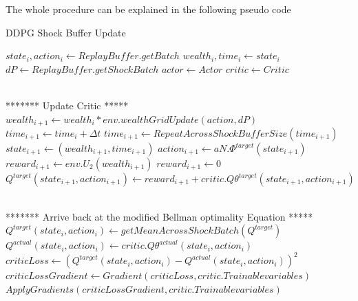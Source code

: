 The whole procedure can be explained in the following pseudo code

\begin{breakablealgorithm}
    

\caption{DDPG Shock Buffer Update}\label{alg:ddpg_shock_buffer_update}
\begin{algorithmic}[1]
\State $state_i,action_i \gets ReplayBuffer.getBatch$
\State $wealth_i,time_i  \gets state_i$
\State $dP \gets ReplayBuffer.getShockBatch$
\State $actor \gets Actor$
\State $critic \gets Critic$

\State \\******* Update Critic  *****\\

\State $wealth_{i+1} \gets wealth_i * env.wealthGridUpdate(action,dP)$  \label{alg:wul}
\State $time_{i+1} \gets time_i + \Delta t$
\State $time_{i+1} \gets RepeatAcrossShockBufferSize(time_{i+1})$ 
\State $state_{i+1} \gets (wealth_{i+1},time_{i+1})$ 
\State $action_{i+1} \gets aN.\Phi^{target}(state_{i+1})$ \label{alg:nal}
    \State $reward_{i+1} \gets env.U_2(wealth_{i+1})$ \label{alg:nrl1}
\Else
    \State $reward_{i+1} \gets 0 $ \label{alg:nrl}
\EndIf
\State $Q^{target}(state_{i+1},action_{i+1}) \gets reward_{i+1} + critic.Q\theta^{target}(state_{i+1},action_{i+1})$ 

\State \\******* Arrive back at the modified Bellman optimality Equation *****\\
\State $Q^{target}(state_i,action_i) \gets getMeanAcrossShockBatch(Q^{target})$ 
\State $Q^{actual}(state_i,action_i) \gets critic.Q\theta^{actual}(state_i,action_i)$
\State $criticLoss \gets (Q^{target}(state_i,action_i)- Q^{actual}(state_i,action_i))^2$
\State $criticLossGradient \gets Gradient(criticLoss,critic.Trainablevariables)$
\State $ApplyGradients(criticLossGradient,critic.Trainablevariables)$


\end{algorithmic}
\end{breakablealgorithm}
